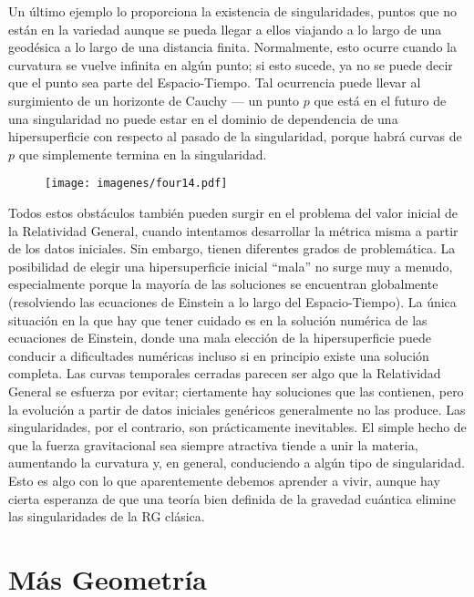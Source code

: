 \documentclass[11pt,b5paper,openany,twoside]{book}
\begin{document}
Un último ejemplo lo proporciona la existencia de singularidades, puntos que no están en la variedad aunque se pueda llegar a ellos viajando a lo largo de una geodésica a lo largo de una distancia finita.
Normalmente, esto ocurre cuando la curvatura se vuelve infinita en algún punto; si esto sucede, ya no se puede decir que el punto sea parte del Espacio-Tiempo.
Tal ocurrencia puede llevar al surgimiento de un horizonte de Cauchy --- un punto $p$ que está en el futuro de una singularidad no puede estar en el dominio de dependencia de una hipersuperficie con respecto al pasado de la singularidad, porque habrá curvas de $p$ que simplemente termina en la singularidad.

\begin{figure}[h]
\centering
\texttt{[image: imagenes/four14.pdf]}
\end{figure}

Todos estos obstáculos también pueden surgir en el problema del valor inicial de la Relatividad General, cuando intentamos desarrollar la métrica misma a partir de los datos iniciales.
Sin embargo, tienen diferentes grados de problemática.
La posibilidad de elegir una hipersuperficie inicial ``mala'' no surge muy a menudo, especialmente porque la mayoría de las soluciones se encuentran globalmente (resolviendo las ecuaciones de Einstein a lo largo del Espacio-Tiempo).
La única situación en la que hay que tener cuidado es en la solución numérica de las ecuaciones de Einstein, donde una mala elección de la hipersuperficie puede conducir a dificultades numéricas incluso si en principio existe una solución completa.
Las curvas temporales cerradas parecen ser algo que la Relatividad General se esfuerza por evitar; ciertamente hay soluciones que las contienen, pero la evolución a partir de datos iniciales genéricos generalmente no las produce.
Las singularidades, por el contrario, son prácticamente inevitables.
El simple hecho de que la fuerza gravitacional sea siempre atractiva tiende a unir la materia, aumentando la curvatura y, en general, conduciendo a algún tipo de singularidad.
Esto es algo con lo que aparentemente debemos aprender a vivir, aunque hay cierta esperanza de que una teoría bien definida de la gravedad cuántica elimine las singularidades de la RG clásica.





\chapter{Más Geometría}
\end{document}
